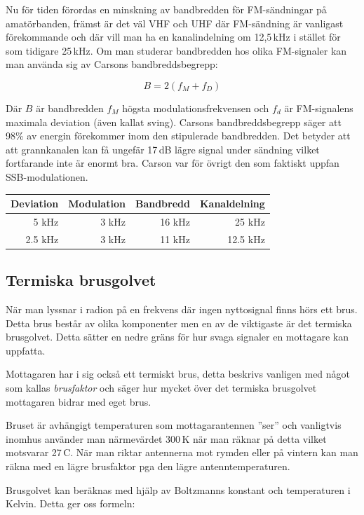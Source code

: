 Nu för tiden förordas en minskning av bandbredden för FM-sändningar på amatörbanden, främst är det väl VHF och UHF där FM-sändning är vanligast förekommande och där vill man ha en kanalindelning om 12,5\,kHz i stället för som tidigare 25\,kHz. Om man studerar bandbredden hos olika FM-signaler kan man använda sig av Carsons bandbreddsbegrepp:

$$B=2(f_M+f_D)$$

Där $B$ är bandbredden $f_M$ högsta modulationsfrekvensen och $f_d$ är FM-signalens maximala deviation (även kallat sving). Carsons bandbreddsbegrepp säger att 98\% av energin förekommer inom den stipulerade bandbredden. Det betyder att att grannkanalen kan få ungefär 17\,dB lägre signal under sändning vilket fortfarande inte är enormt bra. Carson var för övrigt den som faktiskt uppfan SSB-modulationen.

\begin{center}
\begin{tabular}{rrrr}
Deviation & Modulation & Bandbredd & Kanaldelning\\ \hline
5 kHz & 3 kHz & 16 kHz & 25 kHz\\
2.5 kHz & 3 kHz & 11 kHz & 12.5 kHz\\
\end{tabular}
\end{center}

\subsection{Termiska brusgolvet}
När man lyssnar i radion på en frekvens där ingen nyttosignal finns hörs ett brus. Detta brus består av olika komponenter men en av de viktigaste är det termiska brusgolvet. Detta sätter en nedre gräns för hur svaga signaler en mottagare kan uppfatta.

Mottagaren har i sig också ett termiskt brus, detta beskrivs vanligen med något som kallas \textit{brusfaktor} och säger hur mycket över det termiska brusgolvet mottagaren bidrar med eget brus. 

Bruset är avhängigt temperaturen som mottagarantennen ''ser'' och vanligtvis inomhus använder man närmevärdet 300\,K när man räknar på detta vilket motsvarar 27\,\textdegree C. När man riktar antennerna mot rymden eller på vintern kan man räkna med en lägre brusfaktor pga den lägre antenntemperaturen.

Brusgolvet kan beräknas med hjälp av Boltzmanns konstant och temperaturen i Kelvin. Detta ger oss formeln:

